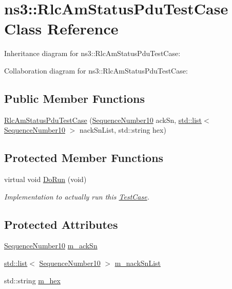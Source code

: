 \hypertarget{classns3_1_1RlcAmStatusPduTestCase}{}\section{ns3\+:\+:Rlc\+Am\+Status\+Pdu\+Test\+Case Class Reference}
\label{classns3_1_1RlcAmStatusPduTestCase}


Inheritance diagram for ns3\+:\+:Rlc\+Am\+Status\+Pdu\+Test\+Case\+:


Collaboration diagram for ns3\+:\+:Rlc\+Am\+Status\+Pdu\+Test\+Case\+:
\subsection*{Public Member Functions}
\begin{DoxyCompactItemize}
\item 
\hyperlink{classns3_1_1RlcAmStatusPduTestCase_a82added01a2d70790a75a27cfd402ae4}{Rlc\+Am\+Status\+Pdu\+Test\+Case} (\hyperlink{classns3_1_1SequenceNumber10}{Sequence\+Number10} ack\+Sn, \hyperlink{openflow-interface_8h_afd9bcfa176617760671b67580f536fa7}{std\+::list}$<$ \hyperlink{classns3_1_1SequenceNumber10}{Sequence\+Number10} $>$ nack\+Sn\+List, std\+::string hex)
\end{DoxyCompactItemize}
\subsection*{Protected Member Functions}
\begin{DoxyCompactItemize}
\item 
virtual void \hyperlink{classns3_1_1RlcAmStatusPduTestCase_ac6a572fa12ff05e75c447431fcbc3f38}{Do\+Run} (void)
\begin{DoxyCompactList}\small\item\em Implementation to actually run this \hyperlink{classns3_1_1TestCase}{Test\+Case}. \end{DoxyCompactList}\end{DoxyCompactItemize}
\subsection*{Protected Attributes}
\begin{DoxyCompactItemize}
\item 
\hyperlink{classns3_1_1SequenceNumber10}{Sequence\+Number10} \hyperlink{classns3_1_1RlcAmStatusPduTestCase_a85b9fb8db0cebdec174b75f79ce32cc3}{m\+\_\+ack\+Sn}
\item 
\hyperlink{openflow-interface_8h_afd9bcfa176617760671b67580f536fa7}{std\+::list}$<$ \hyperlink{classns3_1_1SequenceNumber10}{Sequence\+Number10} $>$ \hyperlink{classns3_1_1RlcAmStatusPduTestCase_a31448a699ee0c00b8176dc83bd1e6635}{m\+\_\+nack\+Sn\+List}
\item 
std\+::string \hyperlink{classns3_1_1RlcAmStatusPduTestCase_a1c5a4599d69e0f98722c2c5e3c89bf76}{m\+\_\+hex}
\end{DoxyCompactItemize}
